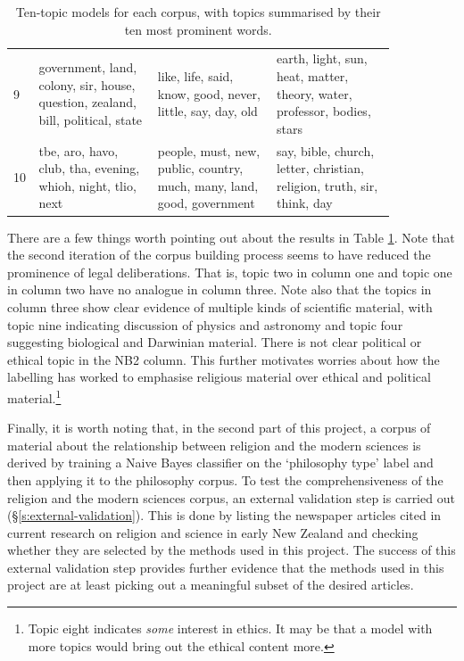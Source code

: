 \documentclass{article}
\begin{document}
\begin{table}[]
\begin{tabular}{p{0.01\linewidth}|p{0.28\linewidth}| p{0.28\linewidth}| p{0.28\linewidth}}
          9	& government, land, colony, sir, house, question, zealand, bill, political, state & like, life, said, know, good, never, little, say, day, old & earth, light, sun, heat, matter, theory, water, professor, bodies, stars \\
          10	& tbe, aro, havo, club, tha, evening, whioh, night, tlio, next &	people, must, new, public, country, much, many, land, good, government	& say, bible, church, letter, christian, religion, truth, sir, think, day \\
        \end{tabular}
        \caption{Ten-topic models for each corpus, with topics summarised by their ten most prominent words.}
        \label{t:ten-topic}
\end{table}

There are a few things worth pointing out about the results in Table \ref{t:ten-topic}. Note that the second iteration of the corpus building process seems to have reduced the prominence of legal deliberations. That is, topic two in column one and topic one in column two have no analogue in column three. Note also that the topics in column three show clear evidence of multiple kinds of scientific material, with topic nine indicating discussion of physics and astronomy and topic four suggesting biological and Darwinian material. There is not clear political or ethical topic in the NB2 column. This further motivates worries about how the labelling has worked to emphasise religious material over ethical and political material.\footnote{Topic eight indicates \emph{some} interest in ethics. It may be that a model with more topics would bring out the ethical content more.}

Finally, it is worth noting that, in the second part of this project, a corpus of material about the relationship between religion and the modern sciences is derived by training a Naive Bayes classifier on the `philosophy type' label and then applying it to the philosophy corpus. To test the comprehensiveness of the religion and the modern sciences corpus, an external validation step is carried out (\S \ref{s:external-validation}). This is done by listing the newspaper articles cited in current research on religion and science in early New Zealand and checking whether they are selected by the methods used in this project. The success of this external validation step provides further evidence that the methods used in this project are at least picking out a meaningful subset of the desired articles.
\end{document}
